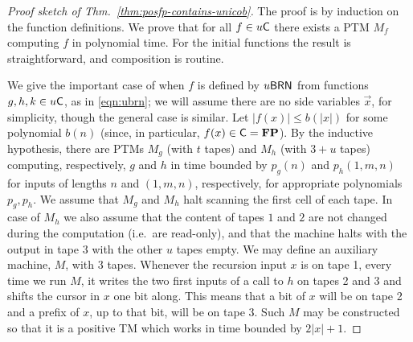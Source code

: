 \documentclass{lmcs}
\begin{document}
%

\begin{proof}
	[Proof sketch of Thm.~\ref{thm:posfp-contains-unicob}]
The proof is by induction on the function definitions. We prove that for all $f\in u \mathsf{C}$ there exists a PTM $M_f$ computing $f$ in polynomial time.
%
For the initial functions the result is straightforward, and composition is routine.

We give the important case of when $f$ is defined by $u\mathsf{BRN}$ from functions $g,h,k \in u \mathsf{C}$, as in \eqref{eqn:ubrn}; we will assume there are no side variables $\vec x$, for simplicity, though the general case is similar. 
Let $|f(x)| \leq b(|x| )$ for some polynomial $b(n)$ (since, in particular, $f(x)  \in \mathsf{C} = \mathbf{FP}$). 
 By the inductive hypothesis, there are PTMs $M_g$ (with $t$ tapes) and $M_h$ (with $3+u$ tapes) computing, respectively, $g$ and $h$ in time bounded by $p_g (n)$ and $p_h(1,m,n)$ for inputs of lengths $n$ and $(1,m,n)$, respectively, for appropriate polynomials $p_g,p_h$. 
We assume that $M_g$ and $M_h$ halt scanning the first cell of each tape. In case of $M_h$ we also assume that the content of tapes $1$ and $2$ are not changed during the computation (i.e.\ are read-only), and that the machine halts with the output in tape $3$ with the other $u$ tapes empty. 
We may define an auxiliary machine, $M$, with 3 tapes. Whenever the recursion input $x$ is on tape 1, every time we run $M$, it writes the two first inputs of a call to $h$ on tapes 2 and 3 and shifts the cursor in $x$ one bit along.
 This means that a bit of $x$ will be on tape 2 and a prefix of $x$, up to that bit, will be on tape 3.
%
%
%
\noindent
Such $M$ may be constructed so that it is a positive TM which works in time bounded by $2|x|+1$. 


\end{proof}
\end{document}

